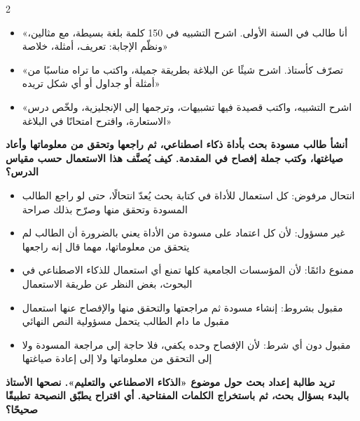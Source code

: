 \documentclass[10pt,a4paper]{article}
\begin{document}
\begin{multicols}{2}
\begin{minipage}{\linewidth}
\begin{itemize}[leftmargin=0.95cm, labelsep=4pt, itemsep=1pt, topsep=3pt, parsep=0pt]
  \item[\textbf{ج)}] «أنا طالب في السنة الأولى. اشرح التشبيه في 150 كلمة بلغة بسيطة، مع مثالين، ونظّم الإجابة: تعريف، أمثلة، خلاصة»
  \item[\textbf{د)}] «تصرّف كأستاذ. اشرح شيئًا عن البلاغة بطريقة جميلة، واكتب ما تراه مناسبًا من أمثلة أو جداول أو أي شكل تريده»
  \item[\textbf{هـ)}] «اشرح التشبيه، واكتب قصيدة فيها تشبيهات، وترجمها إلى الإنجليزية، ولخّص درس الاستعارة، واقترح امتحانًا في البلاغة»
\end{itemize}
\end{minipage}\par\vspace{8pt plus 6pt}
\noindent\begin{minipage}{\linewidth}
\hangindent=0.7cm\textbf{أنشأ طالب مسودة بحث بأداة ذكاء اصطناعي، ثم راجعها وتحقق من معلوماتها وأعاد صياغتها، وكتب جملة إفصاح في المقدمة. كيف يُصنَّف هذا الاستعمال حسب مقياس الدرس؟}
\begin{itemize}[leftmargin=0.95cm, labelsep=4pt, itemsep=1pt, topsep=3pt, parsep=0pt]
  \item[\textbf{أ)}] انتحال مرفوض: كل استعمال للأداة في كتابة بحث يُعدّ انتحالًا، حتى لو راجع الطالب المسودة وتحقق منها وصرّح بذلك صراحة
  \item[\textbf{ب)}] غير مسؤول: لأن كل اعتماد على مسودة من الأداة يعني بالضرورة أن الطالب لم يتحقق من معلوماتها، مهما قال إنه راجعها
  \item[\textbf{ج)}] ممنوع دائمًا: لأن المؤسسات الجامعية كلها تمنع أي استعمال للذكاء الاصطناعي في البحوث، بغض النظر عن طريقة الاستعمال
  \item[\textbf{د)}] مقبول بشروط: إنشاء مسودة ثم مراجعتها والتحقق منها والإفصاح عنها استعمال مقبول ما دام الطالب يتحمل مسؤولية النص النهائي
  \item[\textbf{هـ)}] مقبول دون أي شرط: لأن الإفصاح وحده يكفي، فلا حاجة إلى مراجعة المسودة ولا إلى التحقق من معلوماتها ولا إلى إعادة صياغتها
\end{itemize}
\end{minipage}\par\vspace{8pt plus 6pt}
\noindent\begin{minipage}{\linewidth}
\hangindent=0.7cm\textbf{تريد طالبة إعداد بحث حول موضوع «الذكاء الاصطناعي والتعليم». نصحها الأستاذ بالبدء بسؤال بحث، ثم باستخراج الكلمات المفتاحية. أي اقتراح يطبّق النصيحة تطبيقًا صحيحًا؟}
\begin{itemize}[leftmargin=0.95cm, labelsep=4pt, itemsep=1pt, topsep=3pt, parsep=0pt]

\end{itemize}
\end{minipage}
\end{multicols}
\end{document}
